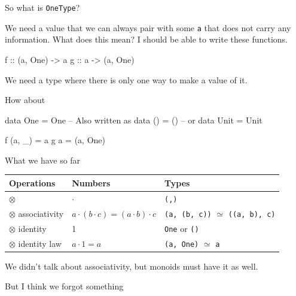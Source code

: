 \documentclass[ignorenonframetext,]{beamer}
\begin{document}
\begin{frame}[fragile]{So what is \texttt{OneType}?}

We need a value that we can always pair with some \texttt{a} that does
not carry any information. What does this mean? I should be able to
write these functions.

\begin{haskellcode}
f :: (a, One) -> a
g :: a -> (a, One)
\end{haskellcode}

We need a type where there is only one way to make a value of it.

\pause

How about

\begin{haskellcode}
data One = One -- Also written as data () = ()
               --              or data Unit = Unit
\end{haskellcode}

\pause

\begin{haskellcode}
f (a, _) = a
g a = (a, One)
\end{haskellcode}

\end{frame}

\begin{frame}[fragile]{What we have so far}

\begin{longtable}[c]{@{}lll@{}}
\toprule
Operations & Numbers & Types\tabularnewline
\midrule
\endhead
\(\otimes\) & \(\cdot\) & \texttt{(,)}\tabularnewline
\(\otimes\) associativity &
\(a \cdot (b \cdot c) = (a \cdot b) \cdot c\) & \texttt{(a,\ (b,\ c))}
\(\simeq\) \texttt{((a,\ b),\ c)}\tabularnewline
\(\otimes\) identity & 1 & \texttt{One} or \texttt{()}\tabularnewline
\(\otimes\) identity law & \(a \cdot 1 = a\) & \texttt{(a,\ One)}
\(\simeq\) \texttt{a}\tabularnewline
\bottomrule
\end{longtable}

We didn't talk about associativity, but monoids must have it as well.

\pause

But I think we forgot something

\end{frame}
\end{document}
